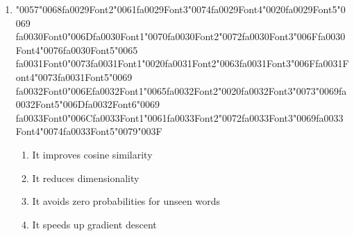 \documentclass[12pt]{article}
\begin{document}
\begin{enumerate}[label=Q\arabic*.]
\begin{enumerate}[label=(\Alph*)]
    \item It cannot be trained with gradient descent
\end{enumerate}
\item {\char"0057}{\char"0068}{\csname fa0029Font2\endcsname\char"0061}{\csname fa0029Font3\endcsname\char"0074}{\csname fa0029Font4\endcsname\char"0020}{\csname fa0029Font5\endcsname\char"0069} {\csname fa0030Font0\endcsname\char"006D}{\csname fa0030Font1\endcsname\char"0070}{\csname fa0030Font2\endcsname\char"0072}{\csname fa0030Font3\endcsname\char"006F}{\csname fa0030Font4\endcsname\char"0076}{\csname fa0030Font5\endcsname\char"0065} {\csname fa0031Font0\endcsname\char"0073}{\csname fa0031Font1\endcsname\char"0020}{\csname fa0031Font2\endcsname\char"0063}{\csname fa0031Font3\endcsname\char"006F}{\csname fa0031Font4\endcsname\char"0073}{\csname fa0031Font5\endcsname\char"0069} {\csname fa0032Font0\endcsname\char"006E}{\csname fa0032Font1\endcsname\char"0065}{\csname fa0032Font2\endcsname\char"0020}{\csname fa0032Font3\endcsname\char"0073}{\char"0069}{\csname fa0032Font5\endcsname\char"006D}{\csname fa0032Font6\endcsname\char"0069} {\csname fa0033Font0\endcsname\char"006C}{\csname fa0033Font1\endcsname\char"0061}{\csname fa0033Font2\endcsname\char"0072}{\csname fa0033Font3\endcsname\char"0069}{\csname fa0033Font4\endcsname\char"0074}{\csname fa0033Font5\endcsname\char"0079}{\char"003F}
\begin{enumerate}[label=(\Alph*)]
    \item It improves cosine similarity
    \item It reduces dimensionality
    \item It avoids zero probabilities for unseen words
    \item It speeds up gradient descent
\end{enumerate}

\end{enumerate}
\end{document}
